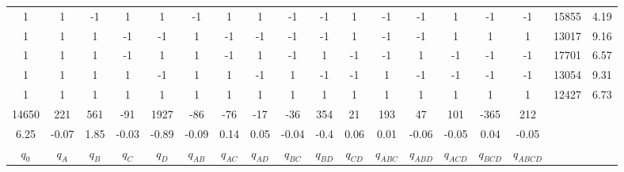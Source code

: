 \documentclass[11pt]{article}
\begin{document}
\begin{landscape}
\begin{table}[]
\begin{tabular}{|cccccccccccccccc|cc|}
		1 & 1 & -1 & 1 & 1 & -1 & 1 & 1 & -1 & -1 & 1 & -1 & -1 & 1 & -1 & -1 & 15855 & 4.19 \\
		1 & 1 & 1 & -1 & -1 & 1 & -1 & -1 & -1 & -1 & 1 & -1 & -1 & 1 & 1 & 1 & 13017 & 9.16 \\
		1 & 1 & 1 & -1 & 1 & 1 & -1 & 1 & -1 & 1 & -1 & -1 & 1 & -1 & -1 & -1 & 17701 & 6.57 \\
		1 & 1 & 1 & 1 & -1 & 1 & 1 & -1 & 1 & -1 & -1 & 1 & -1 & -1 & -1 & -1 & 13054 & 9.31 \\
		1 & 1 & 1 & 1 & 1 & 1 & 1 & 1 & 1 & 1 & 1 & 1 & 1 & 1 & 1 & 1 & 12427 & 6.73 \\ \hline
		14650 & 221 & 561 & -91 & 1927 & -86 & -76 & -17 & -36 & 354 & 21 & 193 & 47 & 101 & -365 & 212 \\
		6.25 & -0.07 & 1.85 & -0.03 & -0.89 & -0.09 & 0.14 & 0.05 & -0.04 & -0.4 & 0.06 & 0.01 & -0.06 & -0.05 & 0.04 & -0.05 \\ \hline
		$q_{0}$ & $q_{A}$ & $q_{B}$ & $q_{C}$ & $q_{D}$ & $q_{AB}$ & $q_{AC}$ & $q_{AD}$ & $q_{BC}$ & $q_{BD}$ & $q_{CD}$ & $q_{ABC}$ & $q_{ABD}$ & $q_{ACD}$ & $q_{BCD}$ & $q_{ABCD}$ & 
	\end{tabular}
\end{table}
\end{landscape}
\end{document}
